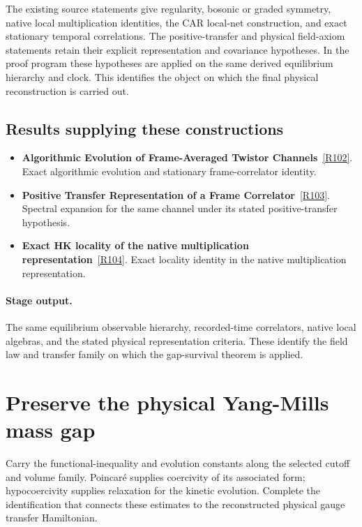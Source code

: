 \documentclass[11pt,a4paper]{article}
\begin{document}
The existing source statements give regularity, bosonic or graded symmetry, native local multiplication identities, the CAR local-net construction, and exact stationary temporal correlations. The positive-transfer and physical field-axiom statements retain their explicit representation and covariance hypotheses. In the proof program these hypotheses are applied on the same derived equilibrium hierarchy and clock. This identifies the object on which the final physical reconstruction is carried out.
\subsection*{Results supplying these constructions}
\begin{itemize}
\item \textbf{Algorithmic Evolution of Frame-Averaged Twistor Channels}~\hyperref[src:thm-effective-twistor-spectral-meaning]{[R102]}. Exact algorithmic evolution and stationary frame-correlator identity.
\item \textbf{Positive Transfer Representation of a Frame Correlator}~\hyperref[src:cor-effective-twistor-positive-transfer]{[R103]}. Spectral expansion for the same channel under its stated positive-transfer hypothesis.
\item \textbf{Exact HK locality of the native multiplication representation}~\hyperref[src:thm-ym-native-multiplication-locality]{[R104]}. Exact locality identity in the native multiplication representation.
\end{itemize}
\paragraph{Stage output.} The same equilibrium observable hierarchy, recorded-time correlators, native local algebras, and the stated physical representation criteria. These identify the field law and transfer family on which the gap-survival theorem is applied.

\section{Preserve the physical Yang-Mills mass gap}
\label{stage:18}
Carry the functional-inequality and evolution constants along the selected cutoff and volume family. Poincar\'e supplies coercivity of its associated form; hypocoercivity supplies relaxation for the kinetic evolution. Complete the identification that connects these estimates to the reconstructed physical gauge transfer Hamiltonian.
\end{document}

